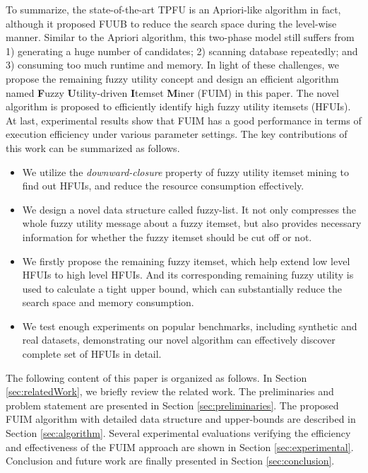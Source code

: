 \documentclass[journal]{IEEEtran}
\begin{document}
To summarize, the state-of-the-art TPFU is an Apriori-like algorithm in fact, although it proposed FUUB to reduce the search space during the level-wise manner. Similar to the Apriori algorithm, this two-phase model still suffers from 1) generating a huge number of candidates; 2) scanning database repeatedly; and 3) consuming too much runtime and memory. In light of these challenges, we propose the remaining fuzzy utility concept and design an efficient algorithm named \textbf{F}uzzy \textbf{U}tility-driven \textbf{I}temset \textbf{M}iner (FUIM) in this paper. The novel algorithm is proposed to efficiently identify high fuzzy utility itemsets (HFUIs). At last, experimental results show that FUIM has a good performance in terms of execution efficiency under various parameter settings. The key contributions of this work can be summarized as follows.

\begin{itemize}
	\item  We utilize the \textit{downward-closure} property of fuzzy utility itemset mining to find out HFUIs, and reduce the resource consumption effectively.
	
	\item  We design a novel data structure called fuzzy-list. It not only compresses the whole fuzzy utility message about a fuzzy itemset, but also provides necessary information for whether the fuzzy itemset should be cut off or not.
	
	\item  We firstly propose the remaining fuzzy itemset, which help extend low level HFUIs to high level HFUIs. And its corresponding remaining fuzzy utility is used to calculate a tight upper bound, which can substantially reduce the search space and memory consumption.
	
	\item  We test enough experiments on popular benchmarks, including synthetic and real datasets, demonstrating our novel algorithm can effectively discover complete set of HFUIs in detail.
	
\end{itemize}	


The following content of this paper is organized as follows. In Section \ref{sec:relatedWork}, we briefly review the related work. The preliminaries and problem statement are presented in Section \ref{sec:preliminaries}. The proposed FUIM algorithm with detailed data structure and upper-bounds are described in Section \ref{sec:algorithm}. Several experimental evaluations verifying the efficiency and effectiveness of the FUIM approach are shown in Section \ref{sec:experimental}. Conclusion and future work are finally presented in Section \ref{sec:conclusion}.
\end{document}
